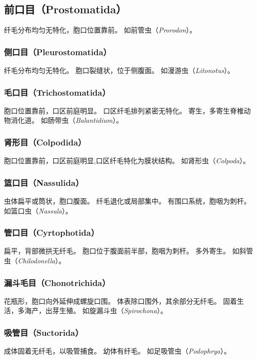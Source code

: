 \documentclass[11pt]{article}
\begin{document}
\subsection{前口目（Prostomatida）}
纤毛分布均匀无特化，胞口位置靠前。
如前管虫（\textit{Prorodon}）。

\subsubsection{侧口目（Pleurostomatida）}
纤毛分布均匀无特化。
胞口裂缝状，位于侧腹面。
如漫游虫（\textit{Litonotus}）。

\subsubsection{毛口目（Trichostomatida）}
胞口位置靠前，口区前庭明显。
口区纤毛排列紧密无特化。
寄生，多寄生脊椎动物消化道。
如肠带虫（\textit{Balantidium}）。

\subsubsection{肾形目（Colpodida）}
胞口位置靠前，口区前庭明显,口区纤毛特化为膜状结构。
如肾形虫（\textit{Colpoda}）。

\subsubsection{篮口目（Nassulida）}
虫体扁平或筒状，胞口腹面。
纤毛退化或局部集中。
有围口系统，胞咽为刺杆。
如篮口虫（\textit{Nassula}）。

\subsubsection{管口目（Cyrtophotida）}
扁平，背部微拱无纤毛。
胞口位于腹面前半部，胞咽为刺杆。
多外寄生。
如斜管虫（\textit{Chilodonella}）。

\subsubsection{漏斗毛目（Chonotrichida）}
花瓶形，胞口向外延伸成螺旋口围。
体表除口围外，其余部分无纤毛。
固着生活，多海产，出芽生殖。
如旋漏斗虫（\textit{Spirochona}）。

\subsubsection{吸管目（Suctorida）}
成体固着无纤毛，以吸管捕食。
幼体有纤毛。
如足吸管虫（\textit{Podophrya}）。
\end{document}
